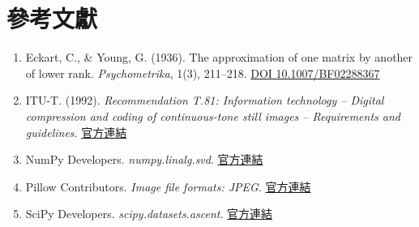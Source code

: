\documentclass[12pt,a4paper,onecolumn]{article}
\begin{document}
\section*{參考文獻}
\begin{enumerate}\setlength{\itemsep}{2bp}
\item Eckart, C., \& Young, G. (1936). The approximation of one matrix by another of lower rank. \textit{Psychometrika}, 1(3), 211--218. \href{https://doi.org/10.1007/BF02288367}{DOI 10.1007/BF02288367}
\item ITU-T. (1992). \textit{Recommendation T.81: Information technology -- Digital compression and coding of continuous-tone still images -- Requirements and guidelines}. \href{https://www.itu.int/rec/T-REC-T.81/en}{官方連結}
\item NumPy Developers. \textit{numpy.linalg.svd}. \href{https://numpy.org/doc/stable/reference/generated/numpy.linalg.svd.html}{官方連結}
\item Pillow Contributors. \textit{Image file formats: JPEG}. \href{https://pillow.readthedocs.io/en/stable/handbook/image-file-formats.html#jpeg}{官方連結}
\item SciPy Developers. \textit{scipy.datasets.ascent}. \href{https://docs.scipy.org/doc/scipy/reference/generated/scipy.datasets.ascent.html}{官方連結}
\end{enumerate}
\end{document}
